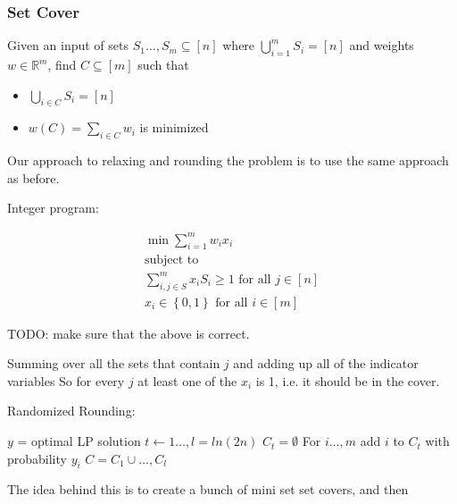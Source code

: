 \documentclass[../notes.tex]{subfiles}
\begin{document}
\subsubsection{Set Cover}

Given an input of sets $ S_1 \ldots,  S_m \subseteq [n] $ where $ \bigcup^m_{i=1} S_i = [n]  $ and weights $ w \in \mathbb{R}^m $, find $ C \subseteq [m] $ such that

\begin{itemize}
    \item $ \bigcup_{i \in C} S_i = [n] $
    \item $ w(C) = \sum_{i \in C} w_i $ is minimized
\end{itemize}


Our approach to relaxing and rounding the problem is to use the same approach as before.

Integer program:

\begin{equation}
    \begin{split}
        \min \sum_{i=1}^m w_i x_i \\
        \text{subject to} \\
        \sum_{i, j \in S}^m x_i S_i \ge 1 \text{ for all } j \in [n] \\
        x_i \in \left\{ 0, 1 \right\} \text{ for all } i \in [m]
    \end{split}
\end{equation}

TODO: make sure that the above is correct.

Summing over all the sets that contain $ j $ and adding up all of the indicator variables
So for every $ j $ at least one of the $ x_i $ is 1, i.e. it should be in the cover.


Randomized Rounding:

\begin{codebox}
\li$ y $ = optimal LP solution
\li\For $  t \gets 1 \ldots, l = ln(2n) $ \Do 
\li    $ C_t = \emptyset $
\li    For $ i \ldots,  m $ add $ i $ to $ C_t $ with probability $ y_i $ \End
\li$ C = C_1 \cup \ldots, C_l $
\end{codebox}


The idea behind this is to create a bunch of mini set set covers, and then 
\end{document}

